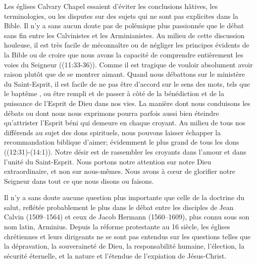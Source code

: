 Les églises Calvary Chapel essaient d'éviter les conclusions hâtives, les terminologies,
 ou les disputes
 sur des sujets qui ne sont pas explicites dans la Bible.
 Il n'y a sans aucun doute pas de polémique plus passionnée que le débat sans fin
 entre les Calvinistes et les Arminianistes. Au milieu de cette discussion houleuse,
 il est très facile de méconnaître ou de négliger les principes évidents de la Bible
 ou de croire que nous avons la capacité de comprendre entièrement les voies du Seigneur
 ((11:33-36)).
 Comme il est tragique de vouloir absolument avoir raison plutôt que de se montrer aimant.
 Quand nous débattons sur le ministère du Saint-Esprit, il est facile de ne pas être d'accord
 sur le sens des mots, tels que le \og baptême \fg{}, ou \og être rempli \fg{} 
 et de passer à côté de la bénédiction et de la puissance de l'Esprit de Dieu dans nos vies.
 La manière dont nous conduisons les débats ou dont nous nous exprimons pourra parfois
 aussi bien \og éteindre \fg{}  qu'\og attrister\fg{} 
 l'Esprit béni qui demeure en chaque croyant.
 Au milieu de tous nos différends au sujet des dons spirituels,
 nous pouvons laisser échapper la recommandation biblique d'aimer;
 évidemment le plus grand de tous les dons ((12:31)-(14:1)).
 Notre désir est de rassembler les croyants dans l'amour et dans l'unité du Saint-Esprit.
 Nous portons notre attention sur notre Dieu extraordinaire, et non sur nous-mêmes.
 Nous avons à cœur de glorifier notre Seigneur dans tout ce que nous disons ou faisons.

Il n'y a sans doute aucune question plus importante que celle de la doctrine du salut,
 reflétée probablement le plus dans le débat entre les disciples de Jean Calvin (1509--1564)
 et ceux de Jacob Hermann (1560--1609), plus connu sous son nom latin, Arminius.
 Depuis la réforme protestante au 16 siècle, les églises chrétiennes
 et leurs dirigeants ne se sont pas entendus sur les questions telles que la dépravation,
 la souveraineté de Dieu, la responsabilité humaine, l'élection, la sécurité éternelle,
 et la nature et l'étendue de l'expiation de Jésus-Christ.

